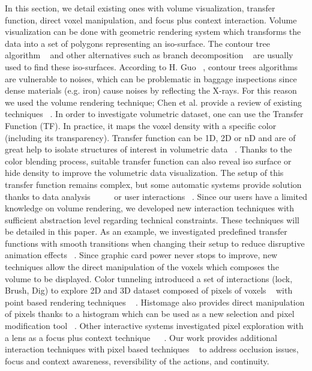 In this section, we detail existing ones with volume visualization, transfer function, direct voxel manipulation, and focus plus context interaction.
Volume visualization can be done with geometric rendering system which transforms the data into a set of polygons representing an iso-surface. The contour tree algorithm ~\cite{carr_computing_2000} and other alternatives such as branch decomposition ~\cite{pascucci_multi-resolution_2004} are usually used to find these iso-surfaces. According to H. Guo ~\cite{guo_local_2013}, contour trees algorithms are vulnerable to noises, which can be problematic in baggage inspections since dense materials (e.g. iron) cause noises by reflecting the X-rays. For this reason we used the volume rendering technique; Chen et al. provide a review of existing techniques ~\cite{chen_3-d_2000}.
In order to investigate volumetric dataset, one can use the Transfer Function (TF). In practice, it maps the voxel density with a specific color (including its transparency). Transfer function can be 1D, 2D or nD and are of great help to isolate structures of interest in volumetric data ~\cite{kniss_multidimensional_2002}. Thanks to the color blending process, suitable transfer function can also reveal iso surface or hide density to improve the volumetric data visualization. The setup of this transfer function remains complex, but some automatic systems provide solution thanks to data analysis ~\cite{correa_size-based_2008} ~\cite{sereda_visualization_2006} ~\cite{patel_moment_2009} or user interactions ~\cite{guo_wysiwyg_2011}. Since our users have a limited knowledge on volume rendering, we developed new interaction techniques with sufficient abstraction level regarding technical constraints. These techniques will be detailed in this paper. As an example, we investigated predefined transfer functions with smooth transitions when changing their setup to reduce disruptive animation effects ~\cite{tversky_animation:_2002}.
Since graphic card power never stops to improve, new techniques allow the direct manipulation of the voxels which composes the volume to be displayed. Color tunneling introduced a set of interactions (lock, Brush, Dig) to explore 2D and 3D dataset composed of pixels of voxels ~\cite{hurter_interactive_2014} with point based rendering techniques ~\cite{sainz_point-based_2004} . Histomage also provides direct manipulation of pixels thanks to a histogram which can be used as a new selection and pixel modification tool ~\cite{chevalier_histomages:_2012}. Other interactive systems investigated pixel exploration with a lens as a focus plus context technique ~\cite{elmqvist_color_2011} ~\cite{hurter_moleview:_2011}. Our work provides additional interaction techniques with pixel based techniques ~\cite{hurter_interactive_2014} to address occlusion issues, focus and context awareness, reversibility of the actions, and continuity.  